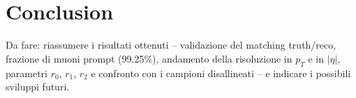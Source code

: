 \documentclass[11pt,a4paper,twoside,openright]{report}
\newif\ifshowtodos
\newenvironment{todo}[1][Nota di Luca]
  {\ifshowtodos\begin{todobox}[#1]\else\setbox0\vbox\bgroup\fi}
  {\ifshowtodos\end{todobox}\else\egroup\fi}
\begin{document}
\clearpage


\chapter{Conclusion}

\begin{todo}[Conclusioni da scrivere]
Da fare: riassumere i risultati ottenuti -- validazione del matching truth/reco,
frazione di muoni prompt (99.25\%), andamento della risoluzione in \(p_T\) e in
\(|\eta|\), parametri \(r_0\), \(r_1\), \(r_2\) e confronto con i campioni disallineati --
e indicare i possibili sviluppi futuri.
\end{todo}



\end{document}
